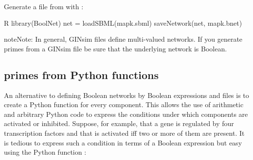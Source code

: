 \documentclass[letterpaper,10pt,english]{sphinxmanual}
\begin{document}
\begin{sphinxVerbatim}[commandchars=\\\{\}]
      
\end{sphinxVerbatim}

Generate a  file from  with {\hyperref[\detokenize{Installation:installation-boolnet}]{}}:

\begin{sphinxVerbatim}[commandchars=\\\{\}]
\PYGZdl{} R
\PYGZgt{} library(BoolNet)
\PYGZgt{} net = loadSBML(\PYGZdq{}mapk.sbml\PYGZdq{})
\PYGZgt{} saveNetwork(net, \PYGZdq{}mapk.bnet\PYGZdq{})
\end{sphinxVerbatim}

\begin{sphinxadmonition}{note}{Note:}
In general, GINsim files define multi-valued networks. If you generate primes from a GINsim file be sure that the underlying network is Boolean.
\end{sphinxadmonition}


\subsection{primes from Python functions}
\label{\detokenize{Manual:primes-from-python-functions}}\label{\detokenize{Manual:id3}}
An alternative to defining Boolean networks by Boolean expressions and  files is to create a Python function for every component.
This allows the use of arithmetic and arbitrary Python code to express the conditions under which components are activated or inhibited.
Suppose, for example, that a gene  is regulated by four transcription factors  and that  is activated iff two or more of them are present.
It is tedious to express such a condition in terms of a Boolean expression but easy using the Python function :

\begin{sphinxVerbatim}[commandchars=\\\{\}]
    \PYG{p}{[}\PYG{p}{]}
\end{sphinxVerbatim}
\end{document}
